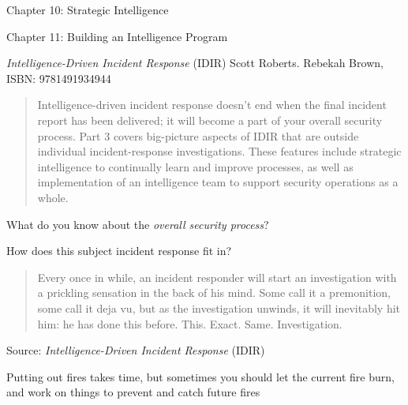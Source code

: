 \documentclass[Screen16to9,17pt]{foils}
\begin{document}
\begin{list2}
\item Chapter 10: Strategic Intelligence
\item Chapter 11: Building an Intelligence Program
\end{list2}



\emph{Intelligence-Driven Incident Response} (IDIR)
 Scott Roberts. Rebekah Brown, ISBN: 9781491934944

\begin{quote}
Intelligence-driven incident response doesn’t end when the final incident report has been delivered; it will become a part of your overall security process. Part 3 covers big-picture aspects of IDIR that are outside individual incident-response investigations. These features include strategic intelligence to continually learn and improve processes, as well as implementation of an intelligence team to support security operations as a whole.
\end{quote}

\begin{list2}
\item What do you know about the \emph{overall security process}?
\item How does this subject incident response fit in?
\end{list2}




\begin{quote}
Every once in while, an incident responder will start an investigation with a prickling
sensation in the back of his mind. Some call it a premonition, some call it deja vu, but
as the investigation unwinds, it will inevitably hit him: he has done this before. This.
Exact. Same. Investigation.
\end{quote}
Source: \emph{Intelligence-Driven Incident Response} (IDIR)


\begin{list2}
\item Putting out fires takes time, but sometimes you should let the current fire burn, and work on things to prevent and catch future fires
\end{list2}



\end{document}

